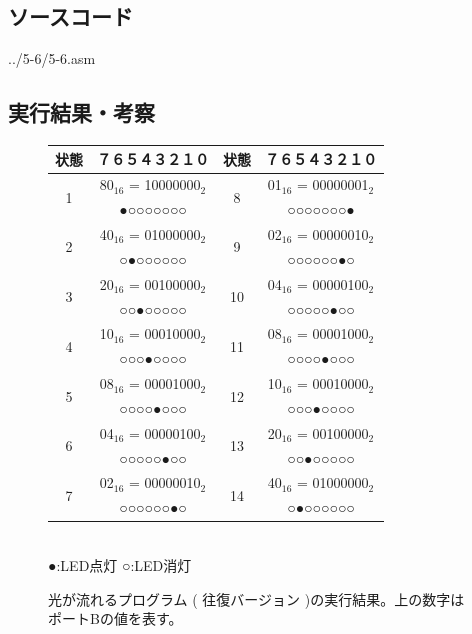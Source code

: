 \documentclass[a4paper,12pt]{ujarticle}
\begin{document}
  \subsection{ソースコード}
   \begin{lstinputlisting}[basicstyle=\ttfamily\footnotesize, frame=single,numbers=left]
    {../5-6/5-6.asm}
   \end{lstinputlisting}
  \subsection{実行結果・考察}
  \begin{figure}[htbp]
   \begin{center}
    \begin{tabular}{c|c||c|c}\hline
     状態&７６５４３２１０       &状態 &７６５４３２１０ \\ \hline
     \multirow{2}{*}{1}&{80}$_{16}$ = 10000000$_2$& \multirow{2}{*}{8}&{01}$_{16}$  = 00000001$_2$ \\
     &●○○○○○○○            & &○○○○○○○● \\ \hline
     \multirow{2}{*}{2}&{40}$_{16}$ = 01000000$_2$ & \multirow{2}{*}{9}&{02}$_{16}$  = 00000010$_2$ \\
     &○●○○○○○○            & &○○○○○○●○ \\ \hline
     \multirow{2}{*}{3}&{20}$_{16}$ = 00100000$_2$ & \multirow{2}{*}{10}&{04}$_{16}$  = 00000100$_2$ \\
     &○○●○○○○○            & &○○○○○●○○ \\ \hline
     \multirow{2}{*}{4}&{10}$_{16}$ = 00010000$_2$ & \multirow{2}{*}{11}&{08}$_{16}$  = 00001000$_2$ \\
     &○○○●○○○○            & &○○○○●○○○ \\ \hline
     \multirow{2}{*}{5}&{08}$_{16}$  = 00001000$_2$ &\multirow{2}{*}{12}& {10}$_{16}$ = 00010000$_2$ \\
     &○○○○●○○○            & &○○○●○○○○ \\ \hline
     \multirow{2}{*}{6}&{04}$_{16}$  = 00000100$_2$ &\multirow{2}{*}{13}& {20}$_{16}$ = 00100000$_2$ \\
     &○○○○○●○○            & &○○●○○○○○ \\ \hline
     \multirow{2}{*}{7}&{02}$_{16}$  = 00000010$_2$ &\multirow{2}{*}{14}&{40}$_{16}$ = 01000000$_2$ \\
     &○○○○○○●○            & &○●○○○○○○ \\ \hline
    \end{tabular}\\
     ●:LED点灯 ○:LED消灯
     \caption{光が流れるプログラム ( 往復バージョン )の実行結果。上の数字はポートBの値を表す。}
     \label{fig:out_5-6}
   \end{center}
  \end{figure}
\end{document}
